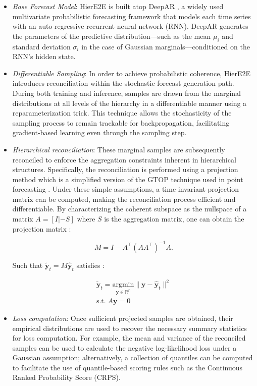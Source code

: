\documentclass[letterpaper]{article}
\begin{document}
\begin{itemize}
     
\item \textit{Base Forecast Model}: HierE2E is built atop DeepAR \cite{DeepAR}, a widely used multivariate probabilistic forecasting framework that models each time series with an auto-regressive recurrent neural network (RNN). 
DeepAR generates the parameters of the predictive distribution---such as the mean $ \mu_i $ and standard deviation $\sigma_i $ in the case of Gaussian marginals---conditioned on the RNN’s hidden state.

\item \textit{Differentiable Sampling}:
In order to achieve probabilistic coherence, HierE2E introduces reconciliation within the stochastic forecast generation path. 
During both training and inference, samples are drawn from the marginal distributions at all levels of the hierarchy in a differentiable manner using a reparameterization trick. 
This technique allows the stochasticity of the sampling process to remain trackable for backpropagation, facilitating gradient-based learning even through the sampling step.

\item \textit{Hierarchical reconciliation}: These marginal samples are subsequently reconciled to enforce the aggregation constraints inherent in hierarchical structures. 
Specifically, the reconciliation is performed using a projection method which is a simplified version of the GTOP technique used in point forecasting \cite{gtop}. 
Under these simple assumptions, a time invariant projection matrix can be computed, making the reconciliation process efficient and differentiable. 
By characterizing the coherent subspace as the nullspace of a matrix $A = \left[ I | - S  \right]$ where $S$ is the aggregation matrix, one can obtain the projection matrix : 

\begin{equation}
    M = I - A^{\top}(AA^{\top})^{-1}A. 
\end{equation}

Such that $\tilde{\mathbf{y}}_t = M\hat{\mathbf{y}}_t$ satisfies :

\begin{multline}
    \tilde{\mathbf{y}}_t = \underset{\mathbf{y}\in \mathbb{R^n}}{\mathrm{argmin}} \|\mathbf{y} - \hat{\mathbf{y}}_t  \|^2 \\
    \mathrm{s.t.} \; A\mathbf{y} = 0
\end{multline}

\item \textit{Loss computation}: Once sufficient projected samples are obtained, their empirical distributions are used to recover the necessary summary statistics for loss computation. 
For example, the mean and variance of the reconciled samples can be used to calculate the negative log-likelihood loss under a Gaussian assumption; alternatively, a collection of quantiles can be computed to facilitate the use of quantile-based scoring rules such as the Continuous Ranked Probability Score (CRPS).

\end{itemize}
\end{document}

